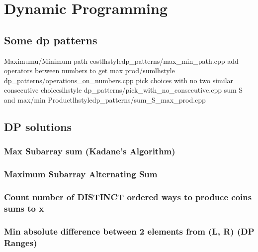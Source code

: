 \section{Dynamic Programming}
  \subsection{Some dp patterns}
        {Maximumu/Minimum path cost}{lhstyle}{dp_patterns/max_min_path.cpp}
        {add operators between numbers to get max prod/sum}{lhstyle} {dp_patterns/operations_on_numbers.cpp}
        {pick choices with no two similar consecutive choices}{lhstyle} {dp_patterns/pick_with_no_consecutive.cpp}
        {sum S and max/min Product}{lhstyle}{dp_patterns/sum_S_max_prod.cpp}

   \subsection{DP solutions}
       \subsubsection{Max Subarray sum (Kadane’s Algorithm)}

       \subsubsection{Maximum Subarray Alternating Sum}


     \subsubsection{Count number of DISTINCT ordered ways to produce coins sums to x}

     \subsubsection{Min absolute difference between 2 elements from (L, R) (DP Ranges)}
